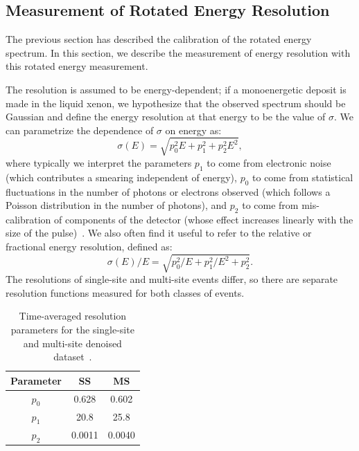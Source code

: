 \subsection{Measurement of Rotated Energy Resolution}\label{sec:RotatedEnergyResMeasurement}

The previous section has described the calibration of the rotated energy spectrum.  In this section, we describe the measurement of energy resolution with this rotated energy measurement.

The resolution is assumed to be energy-dependent; if a monoenergetic deposit is made in the liquid xenon, we hypothesize that the observed spectrum should be Gaussian and define the energy resolution at that energy to be the value of $\sigma$.  We can parametrize the dependence of $\sigma$ on energy as:
\begin{equation}\label{eqn:ResolutionAbsoluteFunctionForm}
\sigma(E) = \sqrt{p_0^2 E + p_1^2 + p_2^2 E^2},
\end{equation}
where typically we interpret the parameters $p_1$ to come from electronic noise (which contributes a smearing independent of energy), $p_0$ to come from statistical fluctuations in the number of photons or electrons observed (which follows a Poisson distribution in the number of photons), and $p_2$ to come from mis-calibration of components of the detector (whose effect increases linearly with the size of the pulse)~\cite{knoll2000radiation}.  We also often find it useful to refer to the relative or fractional energy resolution, defined as:
\begin{equation}
\sigma(E)/E = \sqrt{p_0^2/E + p_1^2/E^2 + p_2^2}.
\end{equation}
The resolutions of single-site and multi-site events differ, so there are separate resolution functions measured for both classes of events.

\begin{table}
\begin{center}
\begin{tabular}{|c|c|c|}
\hline Parameter & SS & MS \\
\hline $p_0$ & 0.628 & 0.602 \\
\hline $p_1$ & 20.8 & 25.8 \\
\hline $p_2$ & 0.0011 & 0.0040 \\ \hline
\end{tabular}
\end{center}
\caption{Time-averaged resolution parameters for the single-site and multi-site denoised dataset~\cite{AverageEnergyResolutionDocument}.}
\label{tab:ResolutionFunctions_DenoisedOnly}
\end{table}


